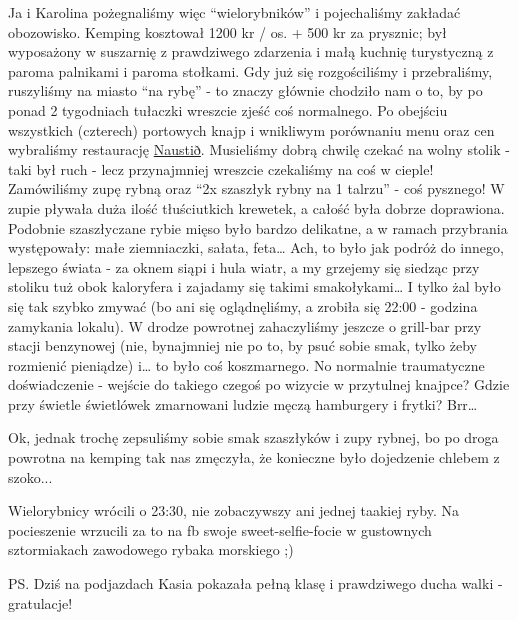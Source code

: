 
Ja i Karolina pożegnaliśmy więc “wielorybników” i pojechaliśmy zakładać obozowisko. Kemping kosztował 1200 kr / os. + 500 kr za prysznic; był wyposażony w suszarnię z prawdziwego zdarzenia i małą kuchnię turystyczną z paroma palnikami i paroma stołkami. Gdy już się rozgościliśmy i przebraliśmy, ruszyliśmy na miasto “na rybę” - to znaczy głównie chodziło nam o to, by po ponad 2 tygodniach tułaczki wreszcie zjeść coś normalnego. Po obejściu wszystkich (czterech) portowych knajp i wnikliwym porównaniu menu oraz cen wybraliśmy restaurację \href{https://www.facebook.com/naustid}{Naustið}. Musieliśmy dobrą chwilę czekać na wolny stolik - taki był ruch - lecz przynajmniej wreszcie czekaliśmy na coś w cieple! Zamówiliśmy zupę rybną oraz “2x szaszłyk rybny na 1 talrzu” - coś pysznego! W zupie pływała duża ilość tłuściutkich krewetek, a całość była dobrze doprawiona. Podobnie szaszłyczane rybie mięso było bardzo delikatne, a w ramach przybrania występowały: małe ziemniaczki, sałata, feta… Ach, to było jak podróż do innego, lepszego świata - za oknem siąpi i hula wiatr, a my grzejemy się siedząc przy stoliku tuż obok kaloryfera i zajadamy się takimi smakołykami… I tylko żal było się tak szybko zmywać (bo ani się oglądnęliśmy, a zrobiła się 22:00 - godzina zamykania lokalu). W drodze powrotnej zahaczyliśmy jeszcze o grill-bar przy stacji benzynowej (nie, bynajmniej nie po to, by psuć sobie smak, tylko żeby rozmienić pieniądze) i… to było coś koszmarnego. No normalnie traumatyczne doświadczenie - wejście do takiego czegoś po wizycie w przytulnej knajpce? Gdzie przy świetle świetlówek zmarnowani ludzie męczą hamburgery i frytki? Brr…

Ok, jednak trochę zepsuliśmy sobie smak szaszłyków i zupy rybnej, bo po droga powrotna na kemping tak nas zmęczyła, że konieczne było dojedzenie chlebem z szoko...

Wielorybnicy wrócili o 23:30, nie zobaczywszy ani jednej taakiej ryby. Na pocieszenie wrzucili za to na fb swoje sweet-selfie-focie w gustownych sztormiakach zawodowego rybaka morskiego ;)

PS. Dziś na podjazdach Kasia pokazała pełną klasę i prawdziwego ducha walki - gratulacje!
